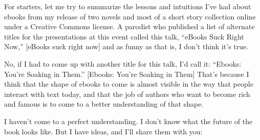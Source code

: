 For starters, let me try to summarize the lessons and intuitions
I've had about ebooks from my release of two novels and most of a
short story collection online under a Creative Commons license. A
parodist who published a list of alternate titles for the
presentations at this event called this talk, ``eBooks Suck Right
Now,'' [eBooks suck right now] and as funny as that is, I don't
think it's true.

No, if I had to come up with another title for this talk, I'd call
it: ``Ebooks: You're Soaking in Them.'' [Ebooks: You're Soaking in
Them] That's because I think that the shape of ebooks to come is
almost visible in the way that people interact with text today, and
that the job of authors who want to become rich and famous is to
come to a better understanding of that shape.

I haven't come to a perfect understanding. I don't know what the
future of the book looks like. But I have ideas, and I'll share
them with you:

